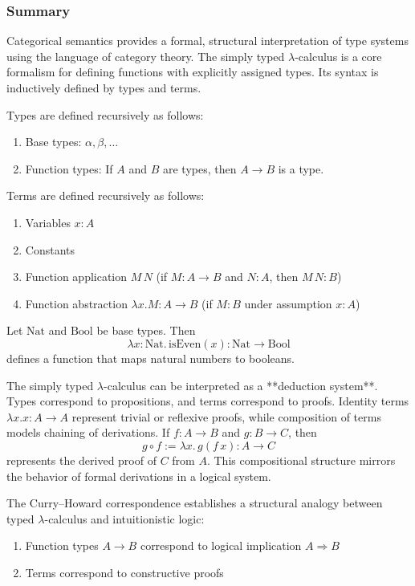 
\subsubsection*{\centering Summary}

Categorical semantics provides a formal, structural interpretation of type systems using the language of category theory. The simply typed $\lambda$-calculus is a core formalism for defining functions with explicitly assigned types. Its syntax is inductively defined by types and terms.

\begin{definition}
Types are defined recursively as follows:
\begin{enumerate}
    \item Base types: $\alpha, \beta, \dots$
    \item Function types: If $A$ and $B$ are types, then $A \to B$ is a type.
\end{enumerate}
\end{definition}
\begin{definition}[Terms]
Terms are defined recursively as follows:
\begin{enumerate}
    \item Variables $x:A$
    \item Constants
    \item Function application $M\,N$ (if $M : A \to B$ and $N : A$, then $M\,N : B$)
    \item Function abstraction $\lambda x.M : A \to B$ (if $M : B$ under assumption $x : A$)
\end{enumerate}
\end{definition}
\begin{example}
Let $\text{Nat}$ and $\text{Bool}$ be base types. Then
\[
\lambda x:\text{Nat}.\, \text{isEven}(x) : \text{Nat} \to \text{Bool}
\]
defines a function that maps natural numbers to booleans.
\end{example}
The simply typed $\lambda$-calculus can be interpreted as a **deduction system**. Types correspond to propositions, and terms correspond to proofs. Identity terms $\lambda x.x : A \to A$ represent trivial or reflexive proofs, while composition of terms models chaining of derivations. If $f : A \to B$ and $g : B \to C$, then
\[
g \circ f := \lambda x.\, g(f\,x) : A \to C
\]
represents the derived proof of $C$ from $A$. This compositional structure mirrors the behavior of formal derivations in a logical system.
\begin{definition}
The Curry--Howard correspondence establishes a structural analogy between typed $\lambda$-calculus and intuitionistic logic:
\begin{enumerate}
    \item Function types $A \to B$ correspond to logical implication $A \Rightarrow B$
    \item Terms correspond to constructive proofs
\end{enumerate}
\end{definition}
